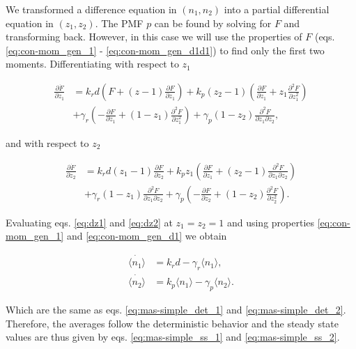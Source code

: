 We transformed a difference equation in $(n_1,n_2)$ into a partial differential equation in $(z_1,z_2)$. The PMF $p$ can be found by solving for $F$ and transforming back. However, in this case we will use the properties of $F$ (eqs. \eqref{eq:con-mom_gen_1} - \eqref{eq:con-mom_gen_d1d1}) to find only the first two moments. Differentiating with respect to $z_1$

\begin{equation}
  \label{eq:dz1}
  \begin{split}
    \frac{\partial \dot{F}}{\partial z_1} &= k_rd\left( F+(z-1)\frac{\partial F}{\partial z_1} \right) + k_p(z_2-1) \left( \frac{\partial F}{\partial z_1} + z_1 \frac{\partial^2 F}{\partial z_1^2} \right)\\
    &+\gamma_r\left(-\frac{\partial F}{\partial z_1}+(1-z_1)\frac{\partial^2 F}{\partial z_1^2}\right)+\gamma_p(1-z_2)\frac{\partial^2 F}{\partial z_1 \partial z_2},
  \end{split}
\end{equation}

and with respect to $z_2$

\begin{equation}
  \label{eq:dz2}
  \begin{split}
    \frac{\partial \dot{F}}{\partial z_2}&=k_rd(z_1-1)\frac{\partial F}{\partial z_2} + k_pz_1\left(\frac{\partial F}{\partial z_1} + (z_2-1)\frac{\partial^2 F}{\partial z_1 \partial z_2} \right)\\
    &+ \gamma_r(1-z_1)\frac{\partial^2 F}{\partial z_1 \partial z_2} + \gamma_p\left(-\frac{\partial F}{\partial z_2}+(1-z_2)\frac{\partial^2 F}{\partial z_2^2}\right).
  \end{split}
\end{equation}

Evaluating eqs. \eqref{eq:dz1} and \eqref{eq:dz2} at $z_1 = z_2 = 1$ and using properties \eqref{eq:con-mom_gen_1} and \eqref{eq:con-mom_gen_d1} we obtain

\begin{align*}
\dot{\langle n_1 \rangle}&= k_rd - \gamma_r \langle n_1 \rangle,\\
\dot{\langle n_2 \rangle}&= k_p\langle n_1 \rangle - \gamma_p \langle n_2 \rangle.
\end{align*}

Which are the same as eqs. \eqref{eq:mas-simple_det_1} and \eqref{eq:mas-simple_det_2}. Therefore, the averages follow the deterministic behavior and the steady state values are thus given by eqs. \eqref{eq:mas-simple_ss_1} and \eqref{eq:mas-simple_ss_2}. 

